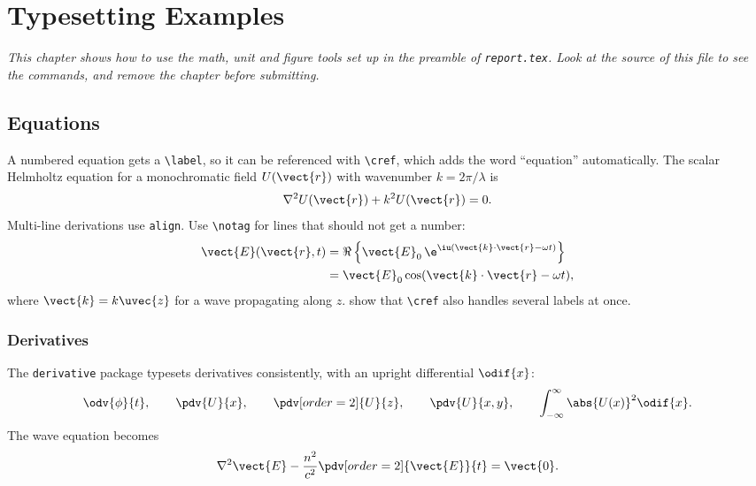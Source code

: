 \chapter{Typesetting Examples}
\label{chapter:typesetting}

\emph{This chapter shows how to use the math, unit and figure tools set up in the preamble of \texttt{report.tex}. Look at the source of this file to see the commands, and remove the chapter before submitting.}

\section{Equations}
\label{sec:equations}

A numbered equation gets a \texttt{\textbackslash label}, so it can be referenced with \texttt{\textbackslash cref}, which adds the word ``equation'' automatically. The scalar Helmholtz equation for a monochromatic field $U(\vect{r})$ with wavenumber $k = 2\pi/\lambda$ is
\begin{equation}
    \label{eq:helmholtz}
    \nabla^2 U(\vect{r}) + k^2 U(\vect{r}) = 0 .
\end{equation}
Multi-line derivations use \texttt{align}. Use \texttt{\textbackslash notag} for lines that should not get a number:
\begin{align}
    \vect{E}(\vect{r}, t) &= \Re\left\{ \vect{E}_0 \, \e^{\iu (\vect{k} \cdot \vect{r} - \omega t)} \right\} \notag \\
                          &= \vect{E}_0 \cos(\vect{k} \cdot \vect{r} - \omega t),
    \label{eq:planewave}
\end{align}
where $\vect{k} = k \uvec{z}$ for a wave propagating along $z$.  show that \texttt{\textbackslash cref} also handles several labels at once.

\subsection{Derivatives}

The \texttt{derivative} package typesets derivatives consistently, with an upright differential $\odif{x}$:
\begin{equation}
    \odv{\phi}{t}, \qquad
    \pdv{U}{x}, \qquad
    \pdv[order=2]{U}{z}, \qquad
    \pdv{U}{x,y}, \qquad
    \int_{-\infty}^{\infty} \abs{U(x)}^2 \odif{x}.
\end{equation}
The wave equation becomes
\begin{equation}
    \nabla^2 \vect{E} - \frac{n^2}{c^2} \pdv[order=2]{\vect{E}}{t} = \vect{0}.
\end{equation}

